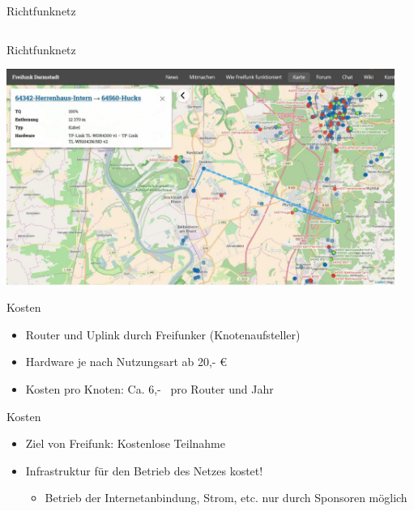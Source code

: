 \documentclass[t]{beamer}
\begin{document}
\begin{frame}{Richtfunknetz}
\begin{columns}
\begin{column}{0.25\textwidth}
\begin{center}
        \end{center}
      \end{column}
    \end{columns}
  \end{frame}

  \begin{frame}{Richtfunknetz}
    \begin{center}
      \includegraphics[width=0.95\textwidth]{images/richtfunk_malchen_stockstadt_pfungstadt}
    \end{center}
  \end{frame}

  \begin{frame}{Kosten}
    \begin{itemize}
      \item Router und Uplink durch Freifunker (Knotenaufsteller)
      \item Hardware je nach Nutzungsart ab 20,- €
      \item Kosten pro Knoten: Ca. 6,- \texteuro\ pro Router und Jahr
    \end{itemize}
  \end{frame}
  
  \begin{frame}{Kosten}
    \begin{itemize}
      \item Ziel von Freifunk: Kostenlose Teilnahme
      \item Infrastruktur für den Betrieb des Netzes kostet!
      \begin{itemize}
      	\item Betrieb der Internetanbindung, Strom, etc. nur durch Sponsoren möglich
      \end{itemize}
    \end{itemize}
  \end{frame}
  
\end{document}
